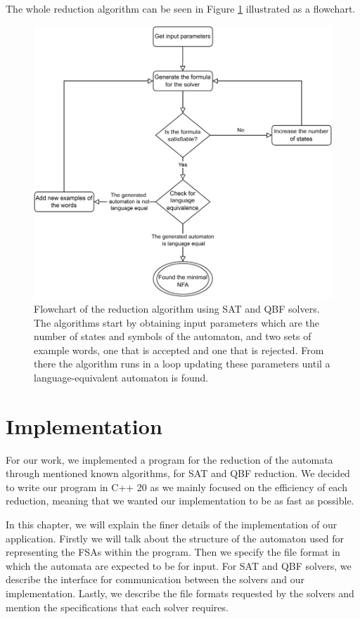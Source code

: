 The whole reduction algorithm can be seen in Figure \ref{fig:flow} illustrated as a flowchart.

\begin{figure}[ht]
    \label{fig:flow}
    \centering
    \includegraphics[width=0.8\linewidth]{obrazky-figures/sat_qbf_alg.drawio.pdf}
    \caption{Flowchart of the reduction algorithm using SAT and QBF solvers. The algorithms start by obtaining input parameters which are the number of states and symbols of the automaton, and two sets of example words, one that is accepted and one that is rejected. From there the algorithm runs in a loop updating these parameters until a language-equivalent automaton is found.}
\end{figure}
\vspace{0.3cm}

\chapter{Implementation}
\label{chap:implementation}

For our work, we implemented a program for the reduction of the automata through mentioned known algorithms, for SAT and QBF reduction. We decided to write our program in C++ 20 as we mainly focused on the efficiency of each reduction, meaning that we wanted our implementation to be as fast as possible.

In this chapter, we will explain the finer details of the implementation of our application. Firstly we will talk about the structure of the automaton used for representing the FSAs within the program. Then we specify the file format in which the automata are expected to be for input. For SAT and QBF solvers, we describe the interface for communication between the solvers and our implementation. Lastly, we describe the file formats requested by the solvers and mention the specifications that each solver requires. 

